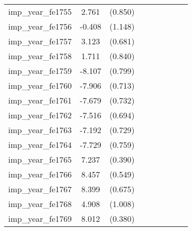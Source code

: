 {\begin{tabular}{l*{4}{cc}}
imp\_year\_fe1755&    2.761\sym{**} &  (0.850)&                  &         &                  &         &                  &         \\
imp\_year\_fe1756&   -0.408         &  (1.148)&                  &         &                  &         &                  &         \\
imp\_year\_fe1757&    3.123\sym{***}&  (0.681)&                  &         &                  &         &                  &         \\
imp\_year\_fe1758&    1.711\sym{*}  &  (0.840)&                  &         &                  &         &                  &         \\
imp\_year\_fe1759&   -8.107\sym{***}&  (0.799)&                  &         &                  &         &                  &         \\
imp\_year\_fe1760&   -7.906\sym{***}&  (0.713)&                  &         &                  &         &                  &         \\
imp\_year\_fe1761&   -7.679\sym{***}&  (0.732)&                  &         &                  &         &                  &         \\
imp\_year\_fe1762&   -7.516\sym{***}&  (0.694)&                  &         &                  &         &                  &         \\
imp\_year\_fe1763&   -7.192\sym{***}&  (0.729)&                  &         &                  &         &                  &         \\
imp\_year\_fe1764&   -7.729\sym{***}&  (0.759)&                  &         &                  &         &                  &         \\
imp\_year\_fe1765&    7.237\sym{***}&  (0.390)&                  &         &                  &         &                  &         \\
imp\_year\_fe1766&    8.457\sym{***}&  (0.549)&                  &         &                  &         &                  &         \\
imp\_year\_fe1767&    8.399\sym{***}&  (0.675)&                  &         &                  &         &                  &         \\
imp\_year\_fe1768&    4.908\sym{***}&  (1.008)&                  &         &                  &         &                  &         \\
imp\_year\_fe1769&    8.012\sym{***}&  (0.380)&                  &         &                  &         &                  &         \\

\end{tabular}}

